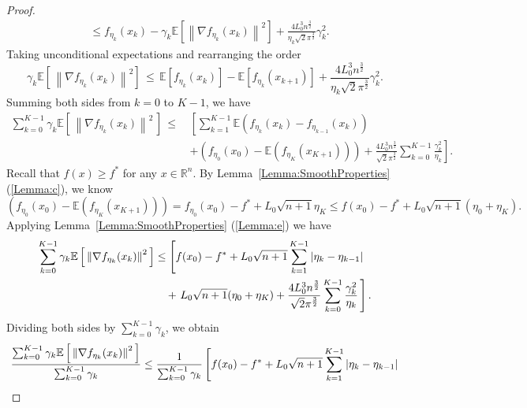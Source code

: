 \documentclass[11pt,reqno]{amsart}
\newcommand{\1}{{\bf 1}}
\newcommand{\2}{{\bf 2}}
\numberwithin{equation}{section}
\theoremstyle{remark}
\begin{document}
{\begin{proof}
\begin{align}
		&\leq f_{\eta_k}(x_k) -  \gamma_k \mathbb{E} \left[\left\|\nabla f_{\eta_k}(x_k)\right\|^2 \right] +\frac{4L_0^3n^{\frac{3}{2}}}{\eta_k\sqrt{2}\pi^{\frac{3}{2}}}\gamma_k^2. 
	\end{align}
	Taking unconditional expectations and rearranging the order
	\begin{equation}
		\gamma_k \mathbb{E}\left[\, \left\|\nabla f_{\eta_k}(x_k)\right\|^2 \right] \,	\leq \, \mathbb{E}\left[f_{\eta_k}(x_k)\right]- \mathbb{E}\left[f_{\eta_k}(x_{k+1})\right]  +\frac{4L_0^3n^{\frac{3}{2}}}{\eta_k\sqrt{2}\pi^{\frac{3}{2}}}\gamma_k^2. 
	\end{equation}
	Summing both sides from $k=0$ to $K-1$, we have 
	\begin{align}
		\sum_{k=0}^{K-1}\gamma_k\mathbb{E}\left[\, \left\|\nabla f_{\eta_k}(x_k)\right\|^2 \, \right] \, \leq \,  &\left[\sum_{k=1}^{K-1}\mathbb{E}\left(f_{\eta_k}(x_k)-f_{\eta_{k-1}}(x_k)\right)\right.\nonumber\\
		&\left.+\left(f_{\eta_0}(x_0)-\mathbb{E}\left(f_{\eta_K}(x_{K+1})\right)\right)+\frac{4L_0^3n^{\frac{3}{2}}}{\sqrt{2}\pi^{\frac{3}{2}}}\sum_{k=0}^{K-1}\frac{\gamma_k^2}{\eta_k} \right].
	\end{align}
	Recall that $f(x) \geq f^*$ for any $ x \in \mathbb{R}^n$. By Lemma~\ref{Lemma:SmoothProperties} (\ref{Lemma:c}), we know 
	\begin{equation*}
		\left(f_{\eta_0}(x_0)-\mathbb{E}\left(f_{\eta_K}(x_{K+1})\right)\right) =  f_{\eta_0}(x_0)-f^*+L_0\sqrt{n+1}\eta_K \leq  f(x_0) - f^* + L_0 \sqrt{n+1}(\eta_0 +\eta_K).
	\end{equation*}
	Applying Lemma~\ref{Lemma:SmoothProperties} (\ref{Lemma:e}) we have
	\begin{align}\label{eq: sumgrad}
		\notag	\sum_{k=0}^{K-1}\gamma_k\mathbb{E}\left[\,  \left\|\nabla f_{\eta_k}(x_k)\right\|^2 \, \right] & \leq   \left[  f(x_0)-f^* + L_0\sqrt{n+1}\sum_{k=1}^{K-1}|\eta_k-\eta_{k-1}| \right. \\
		& ~~~+ \left.L_0\sqrt{n+1}(\eta_0+\eta_K) +\frac{4L_0^3n^{\frac{3}{2}}}{\sqrt{2}\pi^{\frac{3}{2}}}\sum_{k=0}^{K-1}\frac{\gamma_k^2}{\eta_k} \, \right].
	\end{align}
	Dividing both sides by $\sum_{k=0}^{K-1}\gamma_k$, we obtain
	\begin{align}\label{eq:msgraderror}
		\notag	\frac{\sum_{k=0}^{K-1}\gamma_k\mathbb{E}\left[\, \left\|\nabla f_{\eta_k}(x_k)\right\|^2\, \right]}{\sum_{k=0}^{K-1}\gamma_k} &\leq \frac{1}{\sum_{k=0}^{K-1}\gamma_k} \left[f(x_0)-f^*+L_0\sqrt{n+1}\sum_{k=1}^{K-1}|\eta_k-\eta_{k-1}|\right.\\

\end{align}
\end{proof}}
\end{document}
